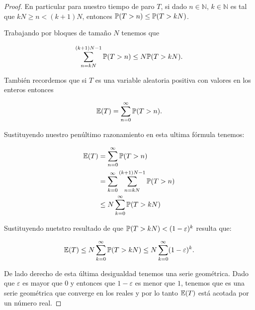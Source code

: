 \begin{proof}
	En particular para nuestro tiempo de paro $T$, si dado $n \in \mathbb{N}$, $k \in \mathbb{N}$ es tal que 
	$kN \geq n < (k+1)N$, entonces $\mathbb{P}(T > n) \leq \mathbb{P}(T > kN)$.\pn

	Trabajando por bloques de tamaño $N$ tenemos que 
    
	\begin{align}
		\sum_{n = kN}^{(k+1)N -1} \mathbb{P}(T > n) \leq N \mathbb{P}(T > kN).
	\end{align}\pn		
	
	También recordemos que si $T$ es una variable aleatoria positiva con valores en los enteros entonces 
	
    \begin{align}
		\mathbb{E}(T) = \sum_{n=0}^{\infty} \mathbb{P}(T > n).
	\end{align}\pn
	
	Sustituyendo nuestro penúltimo razonamiento en esta ultima fórmula tenemos:
	
	\begin{align}
		\mathbb{E}(T) 	&= 		\sum_{n=0}^{\infty} \mathbb{P}(T > n)                              \\
				&= 		\sum_{k=0}^{\infty} \sum_{n = kN}^{(k+1)N -1} \mathbb{P}(T > n)    \\
				&\leq 	N \sum_{k=0}^{\infty} \mathbb{P}(T > kN)
	\end{align}\pn
		
	Sustituyendo nuetstro resultado de que $\mathbb{P}(T>kN)<(1-\varepsilon)^{k}$ resulta que:
    
	\begin{align}
		\mathbb{E}(T)\leq N \sum_{k=0}^{\infty} \mathbb{P}(T > kN) \leq N \sum_{k=0}^{\infty} (1-\varepsilon)^k.
	\end{align}\pn
	
	De lado derecho de esta última desigualdad tenemos una serie geométrica. Dado que $\varepsilon$ es mayor 
	que $0$ y entonces que $1-\varepsilon$ es menor que $1$, tenemos que es una serie geométrica que converge 
	en los reales y por lo tanto $\mathbb{E}(T)$ está acotada por un número real.
\end{proof}	